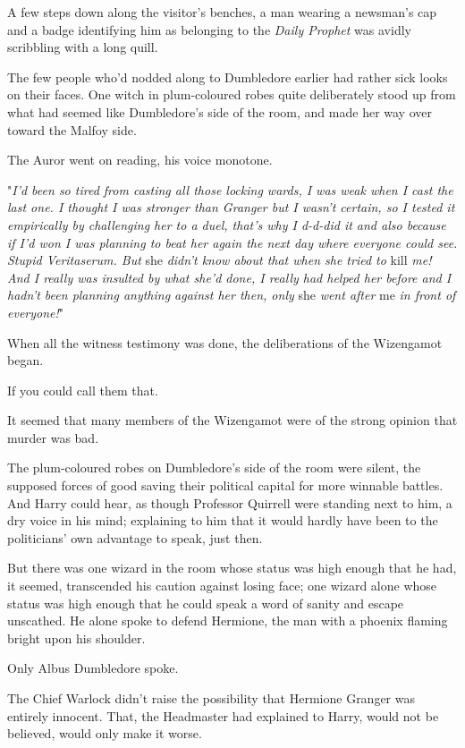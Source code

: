 A few steps down along the visitor's benches, a man wearing a newsman's cap and
a badge identifying him as belonging to the \emph{Daily Prophet} was avidly
scribbling with a long quill.

The few people who'd nodded along to Dumbledore earlier had rather sick looks
on their faces. One witch in plum-coloured robes quite deliberately stood up
from what had seemed like Dumbledore's side of the room, and made her way over
toward the Malfoy side.

The Auror went on reading, his voice monotone.

"\emph{I'd been so tired from casting all those locking wards, I was weak when I
cast the last one. I thought I was stronger than Granger but I wasn't certain,
so I tested it empirically by challenging her to a duel, that's why I d-d-did
it and also because if I'd won I was planning to beat her again the next day
where everyone could see. Stupid Veritaserum. But} she \emph{didn't know about
that when she tried to} kill \emph{me! And I really was insulted by what she'd
done, I really had helped her before and I hadn't been planning anything
against her then, only} she \emph{went after} me \emph{in front of everyone!}"

When all the witness testimony was done, the deliberations of the Wizengamot
began.

If you could call them that.

It seemed that many members of the Wizengamot were of the strong opinion that
murder was bad.

The plum-coloured robes on Dumbledore's side of the room were silent, the
supposed forces of good saving their political capital for more winnable
battles. And Harry could hear, as though Professor Quirrell were standing next
to him, a dry voice in his mind; explaining to him that it would hardly have
been to the politicians' own advantage to speak, just then.

But there was one wizard in the room whose status was high enough that he had,
it seemed, transcended his caution against losing face; one wizard alone whose
status was high enough that he could speak a word of sanity and escape
unscathed. He alone spoke to defend Hermione, the man with a phoenix flaming
bright upon his shoulder.

Only Albus Dumbledore spoke.

The Chief Warlock didn't raise the possibility that Hermione Granger was
entirely innocent. That, the Headmaster had explained to Harry, would not be
believed, would only make it worse.

